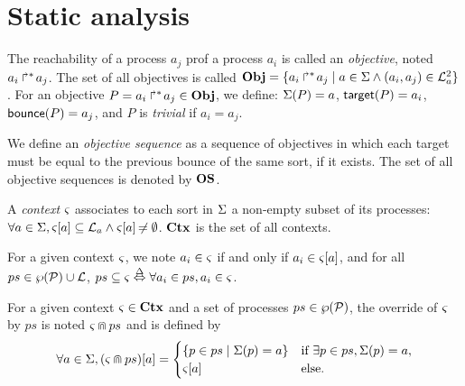 \section{Static analysis}\label{sec:sa}


\begin{definition}
\label{def:obj}
  The reachability of a process $a_j$ prof a process $a_i$ is called an \emph{objective}, noted $\mbox{$a_i\Rsh^*\!a_j$}$.
  The set of all objectives is called $\mathbf{Obj} = \{ \mbox{$a_i\Rsh^*\!a_j$} \mid a \in \Sigma \wedge (a_i, a_j) \in \mathcal{L}_a^2 \}$.
  For an objective $P = \mbox{$a_i\Rsh^*\!a_j$} \in \mathbf{Obj}$, we define: $\Sigma(P) = a$, $\mathsf{target}(P)=a_i$, $\mathsf{bounce}(P)=a_j$,
  and $P$ is \emph{trivial} if $a_i = a_j$.
\end{definition}
We define an \emph{objective sequence} as a sequence of objectives in which each target must be equal to the previous bounce of the same sort, if it exists.
The set of all objective sequences is denoted by $\mathbf{OS}$.

\begin{definition}
\label{def:context}
  A \emph{context} $\varsigma$ associates to each sort in $\Sigma$ a non-empty subset of its processes:
  $\forall a \in \Sigma, {\varsigma[a]} \subseteq \mathcal{L}_a \wedge {\varsigma[a]} \not\nobreak\mkern -2mu = \emptyset$.
  $\mathbf{Ctx}$ is the set of all contexts.
\end{definition}

For a given context $\varsigma$, we note $a_i \in \varsigma$ if and only if $a_i \in {\varsigma[a]}$,
and for all $ps \in \wp(\mathcal{P}) \cup \mathcal{L}$, $ps \subseteq \varsigma \stackrel{\Delta}\Leftrightarrow \forall a_i \in ps, a_i \in \varsigma$.

\begin{definition}[$\Cap: \Ctx \times \powerset(\PHproc) \mapsto \Ctx$]
\label{def:ctxcap}
  For a given context $\varsigma\in\mathbf{Ctx}$ and a set of processes $ps \in \wp(\mathcal{P})$,
  the override of $\varsigma$ by $ps$ is noted $\varsigma \Cap ps$ and is defined by
  \[ \forall a \in \Sigma, {(\varsigma \Cap ps)[a]} =
  \begin{cases}
    \{ p \in ps \mid \Sigma(p)=a \} & \text{if } \exists p \in ps, \Sigma(p)=a,\\
    {\varsigma[a]} & \text{else.}
  \end{cases}
  \]
\end{definition}

